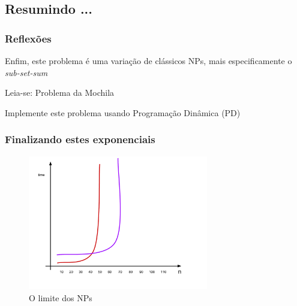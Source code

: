 \documentclass{beamer}
\begin{document}



\subsection{Resumindo ... }

\begin{frame}
\frametitle{Reflexões}
\begin{block}{}   %
\begin{flushleft}

\vspace{1cm}
 \textsf{Enfim, este problema é uma variação de clássicos
NPs, mais especificamente o \textit{sub-set-sum}}

\vspace{1cm}
 \textsf{Leia-se: Problema da Mochila}


\vspace{1cm}
 \textsf{Implemente este problema usando Programação Dinâmica (PD)}

      \end{flushleft}

    \end{block}
  \end{frame}




\begin{frame}
\frametitle{Finalizando estes exponenciais}

\begin{figure}[h!b]
\begin{center}
\includegraphics[width=0.7\textwidth , height=0.7\textheight]{figures/Execution-Time-NP-01.pdf}
\caption{O limite dos NPs}
\label{fig_Execution-Time-NP-01}
\end{center}
\end{figure}


\end{frame}
\end{document}

